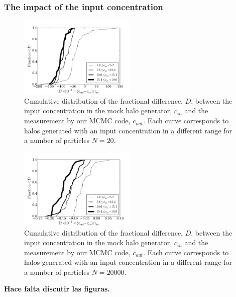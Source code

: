 \documentclass{emulateapj}
\begin{document}
\subsubsection{The impact of the input concentration}

\begin{figure}
\begin{center}
  \includegraphics[width=0.50\textwidth]{mock_percentual_diff_conc_20.pdf}
\end{center}
\caption{Cumulative distribution of the fractional difference, $D$, between
  the input concentration in the mock halo generator, $c_{in}$ and the
  measurement by our MCMC code, $c_{out}$. Each curve corresponds to
  halos generated with an input concentration in a different range for
  a number of particles $N=20$.
    \label{fig:results_mocks_conc_20}}
\end{figure}

\begin{figure}
\begin{center}
  \includegraphics[width=0.50\textwidth]{mock_percentual_diff_conc_20000.pdf}
\end{center}
\caption{Cumulative distribution of the fractional difference, $D$, between
  the input concentration in the mock halo generator, $c_{in}$ and the
  measurement by our MCMC code, $c_{out}$. Each curve corresponds to
  halos generated with an input concentration in a different range for
  a number of particles $N=20000$.
    \label{fig:results_mocks_conc_20000}}
\end{figure}


{\bf Hace falta discutir las figuras.}
\end{document}
